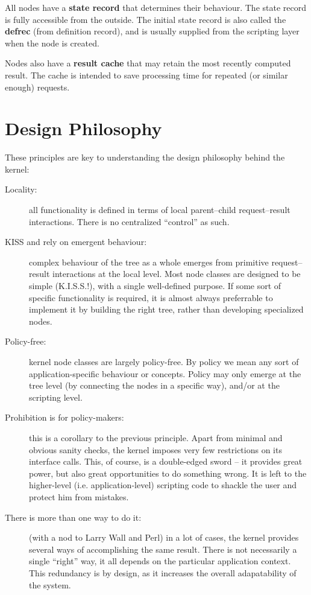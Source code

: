  All nodes have a {\bf state record} that determines their behaviour. The state
  record is fully accessible from the outside. The initial state record is also
  called the {\bf defrec} (from definition record), and is usually supplied from
  the scripting layer when the node is created.

  Nodes also have a {\bf result cache} that may retain the most recently computed
  result. The cache is intended to save processing time for repeated (or similar
  enough) requests.

\section{Design Philosophy}

  These principles are key to understanding the design philosophy behind the
  kernel:

  \begin{description}

  \item[Locality:] all functionality is defined in terms of local parent--child
  request--result interactions. There is no centralized ``control'' as such.

  \item[KISS and rely on emergent behaviour:] complex behaviour of the tree as
  a whole emerges from primitive request--result interactions at the local
  level. Most node classes are designed to be simple (K.I.S.S.!), with a single
  well-defined purpose. If some sort of specific functionality is required, it
  is almost always preferrable to implement it by building the right tree,
  rather than developing specialized nodes.

  \item[Policy-free:] kernel node classes are largely policy-free. By policy we
  mean any sort of application-specific behaviour or concepts. Policy may only
  emerge at the tree level (by connecting the nodes in a specific way), and/or
  at the scripting level.

  \item[Prohibition is for policy-makers:] this is a corollary to the
  previous principle. Apart from minimal and obvious sanity checks, the kernel
  imposes very few restrictions on its interface calls. This, of course, is a
  double-edged sword -- it provides great power, but also great opportunities
  to do something wrong. It is left to the higher-level (i.e.
  application-level) scripting code to shackle the user and protect him from
  mistakes.

  \item[There is more than one way to do it:] (with a nod to Larry Wall and
  Perl) in a lot of cases, the kernel provides several ways of accomplishing
  the same  result. There is not necessarily a single ``right'' way, it all
  depends on the particular application context. This redundancy is by design,
  as it increases the overall adapatability of the system.

  \end{description}


